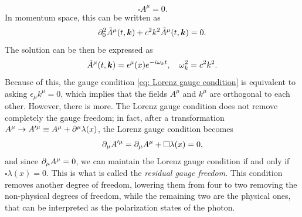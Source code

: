 \begin{equation}
    \square A^\mu = 0.
\end{equation}
In momentum space, this can be written as 
\begin{equation}
    \partial_0^2\tilde{A}^\mu(t,\bm{k}) + c^2k^2\tilde{A}^\mu(t,\bm{k}) = 0.
\end{equation}
The solution can be then be expressed as 
\begin{equation}
    \tilde{A}^\mu(t,\bm{k}) = \epsilon^{\mu}(x)e^{-i\omega_kt},\quad \omega_k^2 = c^2k^2.
\end{equation}
Because of this, the gauge condition \eqref{eq: Lorenz gauge condition} is equivalent to asking $\epsilon_\mu k^\mu = 0$, which implies that the fields $A^\mu$ and $k^\mu$ are orthogonal to each other. However, there is more. The Lorenz gauge condition does not remove completely the gauge freedom; in fact, after a transformation $A^\mu \to A^{\prime\mu} \equiv A^\mu + \partial^\mu\lambda(x)$, the Lorenz gauge condition becomes 
\begin{equation}
    \partial_\mu A^{\prime\mu} = \partial_\mu A^\mu + \square\lambda(x) = 0,
\end{equation}
and since $\partial_\mu A^\mu = 0$, we can maintain the Lorenz gauge condition if and only if $\square \lambda(x) = 0$. This is what is called the \emph{residual gauge freedom}. This condition removes another degree of freedom, lowering them from four to two removing the non-physical degrees of freedom, while the remaining two are the physical ones, that can be interpreted as the polarization states of the photon. 


